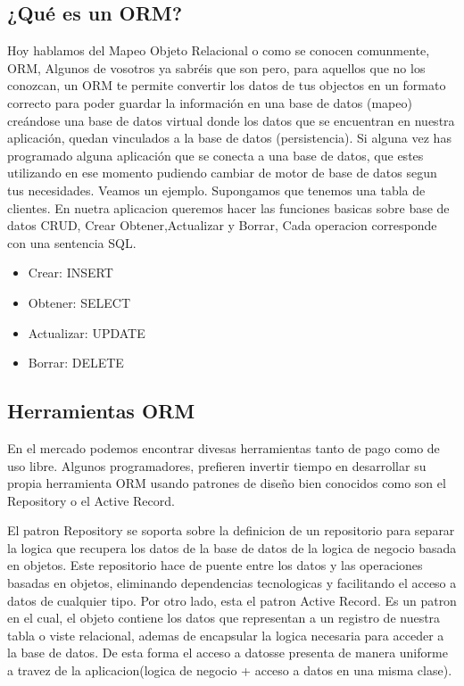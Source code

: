 \documentclass[twoside,twocolumn]{article}
\begin{document}
\subsection{¿Qué es un ORM?}

Hoy hablamos del Mapeo Objeto Relacional o como se conocen comunmente, ORM, Algunos de vosotros ya 
sabréis que son pero, para aquellos que
no los conozcan, un ORM te permite
convertir los datos de tus objectos en un
formato correcto para poder guardar la
información en una base de datos (mapeo)
creándose una base de datos virtual
donde los datos que se encuentran en
nuestra aplicación, quedan vinculados a
la base de datos (persistencia). Si alguna vez has programado alguna aplicación que se conecta a una base de
datos, que estes utilizando en ese momento pudiendo cambiar de motor de base de datos segun tus necesidades.
Veamos un ejemplo. Supongamos que tenemos una tabla de clientes. En nuetra aplicacion queremos hacer las funciones basicas
sobre base de datos CRUD, Crear Obtener,Actualizar y Borrar, Cada operacion corresponde con una sentencia SQL. 
\begin{itemize}
	\item Crear: INSERT
	\item Obtener: SELECT
	\item Actualizar: UPDATE
	\item Borrar: DELETE
\end{itemize}



\subsection{Herramientas ORM}

En el mercado podemos encontrar divesas herramientas tanto de pago como de uso libre. Algunos programadores, 
prefieren invertir tiempo en desarrollar su propia herramienta ORM usando patrones de diseño bien conocidos como 
son el Repository o el Active Record.

El patron Repository se soporta sobre la definicion de un repositorio para separar la logica que recupera los datos de 
la base de datos de la logica de negocio basada en objetos. Este repositorio hace de puente entre los datos y las operaciones basadas
en objetos, eliminando dependencias tecnologicas y facilitando el acceso a datos de cualquier tipo.
Por otro lado, esta el patron Active Record. Es un patron en el cual, el objeto contiene los datos que representan a un registro de 
nuestra tabla o viste relacional, ademas de encapsular la logica necesaria para acceder a la base de datos. De esta forma el acceso a datosse presenta de manera uniforme a travez
de la aplicacion(logica de negocio + acceso a datos en una misma clase).
\end{document}
